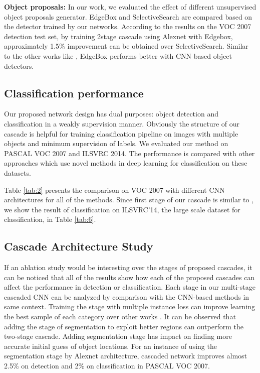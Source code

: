 \documentclass[10pt,twocolumn,letterpaper]{article}
\begin{document}
\textbf{Object proposals:} In our work, we evaluated the effect of different unsupervised object proposals generator. EdgeBox \cite{edgebox} and SelectiveSearch \cite{SS} are compared based on the detector trained by our networks. According to the results on the VOC 2007 detection test set, by training 2stage cascade using Alexnet with Edgebox, approximately 1.5\% improvement can be obtained over SelectiveSearch. Similar to the other works like \cite{bilen16,SPPNET}, EdgeBox performs better with CNN based object detectors.

\subsection{Classification performance}
 Our proposed network design has dual purposes: object detection and classification in a weakly supervision manner. Obviously the structure of our cascade is helpful for training classification pipeline on images with multiple objects and minimum supervision of labels. We evaluated our method on PASCAL VOC 2007 and ILSVRC 2014. The performance is compared with other approaches which use novel methods in deep learning for classification on these datasets. 
 
Table \ref{tab:2} presents the comparison on VOC 2007 with different CNN architectures for all of the methods. Since first stage of our cascade is similar to \cite{gap_paper}, we show the result of classification on ILSVRC'14, the large scale dataset for classification, in Table \ref{tab:6}. 
 

\subsection{Cascade Architecture  Study}
If an ablation study would be interesting over the stages of proposed cascades, it can be noticed that all of the results show how each of the proposed cascades can affect the performance in detection or classification. Each stage in our multi-stage cascaded CNN can be analyzed by comparison with the CNN-based methods in same context. Training the stage with multiple instance loss can improve learning the best sample of each category over other works \cite{gap_paper, bilen16}.
It can be observed that adding the stage of segmentation to exploit better regions can outperform the two-stage cascade. Adding segmentation stage has impact on finding more accurate initial guess of object locations. For an instance of using the segmentation stage by Alexnet architecture, cascaded network improves almost 2.5\% on detection and 2\% on classification in PASCAL VOC 2007.
\end{document}
